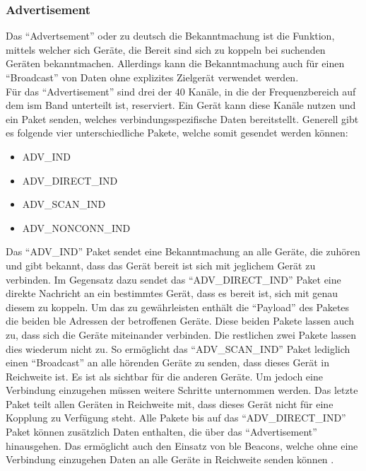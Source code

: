 \subsubsection{Advertisement}
\label{sss:funktionsweise:advertisement}

Das "`Advertsement"' oder zu deutsch die Bekanntmachung ist die Funktion, mittels welcher sich Geräte, die Bereit sind sich zu koppeln bei suchenden Geräten bekanntmachen. Allerdings kann die Bekanntmachung auch für einen "`Broadcast"' von Daten ohne explizites Zielgerät verwendet werden.\\

\noindent Für das "`Advertisement"' sind drei der 40 Kanäle, in die der Frequenzbereich auf dem \ac{ism} Band unterteilt ist, reserviert. Ein Gerät kann diese Kanäle nutzen und ein Paket senden, welches verbindungsspezifische Daten bereitstellt. Generell gibt es folgende vier unterschiedliche Pakete, welche somit gesendet werden können:
\begin{itemize}
	\item{ADV\_IND}
	\item{ADV\_DIRECT\_IND}
	\item{ADV\_SCAN\_IND}
	\item{ADV\_NONCONN\_IND}
\end{itemize} 
Das "`ADV\_IND"' Paket sendet eine Bekanntmachung an alle Geräte, die zuhören und gibt bekannt, dass das Gerät bereit ist sich mit jeglichem Gerät zu verbinden. Im Gegensatz dazu sendet das "`ADV\_DIRECT\_IND"' Paket eine direkte Nachricht an ein bestimmtes Gerät, dass es bereit ist, sich mit genau diesem zu koppeln. Um das zu gewährleisten enthält die "`Payload"' des Paketes die beiden \ac{ble} Adressen der betroffenen Geräte. Diese beiden Pakete lassen auch zu, dass sich die Geräte miteinander verbinden. Die restlichen zwei Pakete lassen dies wiederum nicht zu. So ermöglicht das "`ADV\_SCAN\_IND"' Paket lediglich einen "`Broadcast"' an alle hörenden Geräte zu senden, dass dieses Gerät in Reichweite ist. Es ist als sichtbar für die anderen Geräte. Um jedoch eine Verbindung einzugehen müssen weitere Schritte unternommen werden. Das letzte Paket teilt allen Geräten in Reichweite mit, dass dieses Gerät nicht für eine Kopplung zu Verfügung steht. Alle Pakete bis auf das "`ADV\_DIRECT\_IND"' Paket können zusätzlich Daten enthalten, die über das "`Advertisement"' hinausgehen. Das ermöglicht auch den Einsatz von \ac{ble} Beacons, welche ohne eine Verbindung einzugehen Daten an alle Geräte in Reichweite senden können \cite{ADV:WWW}.\\

